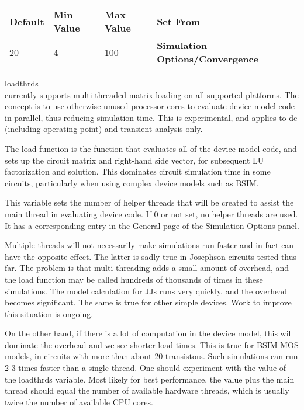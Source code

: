 \begin{description}
\begin{tabular}{|l|l|l|l|}\hline
\bf Default & \bf Min Value & \bf Max Value & \bf Set From\\ \hline
20 & 4 & 100 & \bf Simulation Options/Convergence\\ \hline
\end{tabular}

\item{\et loadthrds}\\
{\WRspice} currently supports multi-threaded matrix loading on all
supported platforms.  The concept is to use otherwise unused processor
cores to evaluate device model code in parallel, thus reducing
simulation time.  This is experimental, and applies to dc (including
operating point) and transient analysis only.

The load function is the function that evaluates all of the device
model code, and sets up the circuit matrix and right-hand side vector,
for subsequent LU factorization and solution.  This dominates circuit
simulation time in some circuits, particularly when using complex
device models such as BSIM.

This variable sets the number of helper threads that will be created
to assist the main thread in evaluating device code.  If 0 or not set,
no helper threads are used.  It has a corresponding entry in the
{\cb General} page of the {\cb Simulation Options} panel.

Multiple threads will not necessarily make simulations run faster and
in fact can have the opposite effect.  The latter is sadly true in
Josephson circuits tested thus far.  The problem is that
multi-threading adds a small amount of overhead, and the load function
may be called hundreds of thousands of times in these simulations. 
The model calculation for JJs runs very quickly, and the overhead
becomes significant.  The same is true for other simple devices.  Work
to improve this situation is ongoing.

On the other hand, if there is a lot of computation in the device
model, this will dominate the overhead and we see shorter load times. 
This is true for BSIM MOS models, in circuits with more than about 20
transistors.  Such simulations can run 2-3 times faster than a single
thread.  One should experiment with the value of the {\et loadthrds}
variable.  Most likely for best performance, the value plus the main
thread should equal the number of available hardware threads, which is
usually twice the number of available CPU cores.


\end{description}
